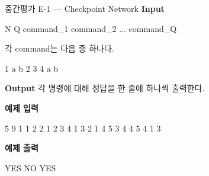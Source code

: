 \begin{problembox}{중간평가 E-1 --- Checkpoint Network}
\textbf{Input}
\begin{TextBlock}
N Q
command_1
command_2
...
command_Q
\end{TextBlock}

각 command는 다음 중 하나다.
\begin{TextBlock}
1 a b
2
3
4 a b
\end{TextBlock}

\textbf{Output}
각  명령에 대해 정답을 한 줄에 하나씩 출력한다.

\textbf{예제 입력}
\begin{TextBlock}
5 9
1 1 2
2
1 2 3
4 1 3
2
1 4 5
3
4 4 5
4 1 3
\end{TextBlock}

\textbf{예제 출력}
\begin{TextBlock}
YES
NO
YES
\end{TextBlock}
\end{problembox}

